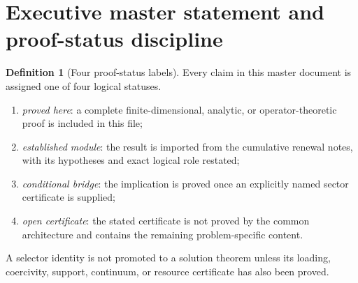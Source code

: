 \documentclass[11pt]{article}
\theoremstyle{definition}
\newtheorem{definition}[theorem]{Definition}
\theoremstyle{remark}
\begin{document}
\begin{abstract}
Every conclusion in this file remains status labelled.  The flagship
microscopic process has not yet been shown to pass all coherent-history,
source-range, compact-screen, potential, counterterm, Ward, and global
boundary certificates.  Orientation selection and the numerical values of
\(G\) and \(\Lambda\) remain phase and metrological data.  Arithmetic,
Yang--Mills, fluid, algebraic, and complexity interfaces continue to require
their own sector-specific coercive or comparison estimates.
\end{abstract}



\tableofcontents


\section{Executive master statement and proof-status discipline}
\label{sec:executive-master}

\begin{definition}[Four proof-status labels]
Every claim in this master document is assigned one of four logical statuses.
\begin{enumerate}[label=\textup{(\roman*)},leftmargin=2.7em]
\item \emph{proved here}: a complete finite-dimensional, analytic, or
      operator-theoretic proof is included in this file;
\item \emph{established module}: the result is imported from the cumulative
      renewal notes, with its hypotheses and exact logical role restated;
\item \emph{conditional bridge}: the implication is proved once an explicitly
      named sector certificate is supplied;
\item \emph{open certificate}: the stated certificate is not proved by the
      common architecture and contains the remaining problem-specific content.
\end{enumerate}
A selector identity is not promoted to a solution theorem unless its loading,
coercivity, support, continuum, or resource certificate has also been proved.
\end{definition}
\end{document}

